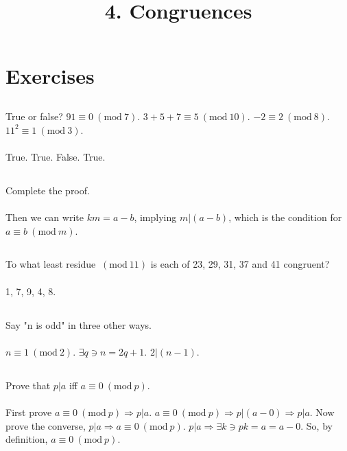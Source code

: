 \documentclass{article}
\begin{document}
\newcommand{\Z}{\mathbb{Z}}
\newcommand{\Mod}[1]{\ (\mathrm{mod}\ #1)}

\title{4. Congruences}
\section{Exercises}

\subsection{}
True or false? $91 \equiv 0 \Mod{7}$. $3 + 5 + 7 \equiv 5 \Mod{10}$.
$-2 \equiv 2 \Mod{8}$. $11^2 \equiv 1 \Mod{3}$.\\~\\
True. True. False. True.

\subsection{}
Complete the proof.\\~\\
Then we can write $km = a - b$, implying $m|(a - b)$, which is the condition
for $a \equiv b \Mod{m}$.

\subsection{}
To what least residue $\Mod{11}$ is each of 23, 29, 31, 37 and 41 congruent?\\~\\
1, 7, 9, 4, 8.

\subsection{}
Say "n is odd" in three other ways.\\~\\
$n \equiv 1 \Mod{2}$. $\exists q \ni n = 2q + 1$. $2|(n - 1)$.

\subsection{}
Prove that $p|a$ iff $a \equiv 0 \Mod{p}$.\\~\\
First prove $a \equiv 0 \Mod{p} \Rightarrow p|a$.
$a \equiv 0 \Mod{p} \Rightarrow p|(a - 0) \Rightarrow p|a$.
Now prove the converse, $p|a \Rightarrow a \equiv 0 \Mod{p}$.
$p|a \Rightarrow \exists k \ni pk = a = a - 0$.
So, by definition, $a \equiv 0 \Mod{p}$.
\end{document}
